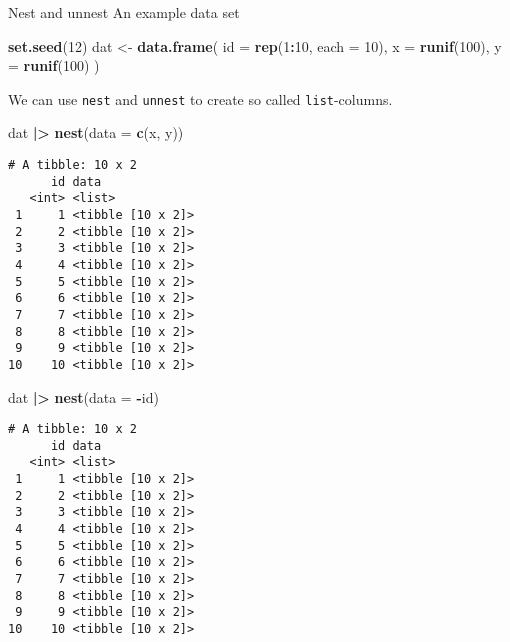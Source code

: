 \documentclass[ignorenonframetext,,t]{beamer}
\let\oldtextbf\textbf
\renewcommand{\textbf}[1]{\textcolor{spamwell}{\oldtextbf{#1}}}
\newenvironment{Shaded}{\begin{snugshade}}{\end{snugshade}}
\newcommand{\AttributeTok}[1]{\textcolor[rgb]{0.13,0.29,0.53}{#1}}
\newcommand{\DecValTok}[1]{\textcolor[rgb]{0.00,0.00,0.81}{#1}}
\newcommand{\FunctionTok}[1]{\textcolor[rgb]{0.13,0.29,0.53}{\textbf{#1}}}
\newcommand{\NormalTok}[1]{#1}
\newcommand{\OtherTok}[1]{\textcolor[rgb]{0.56,0.35,0.01}{#1}}
\newcommand{\SpecialCharTok}[1]{\textcolor[rgb]{0.81,0.36,0.00}{\textbf{#1}}}
\begin{document}
\begin{frame}[fragile]{Nest and unnest}
\label{nest-and-unnest}
An example data set

\begin{Shaded}
\begin{Highlighting}[]
\FunctionTok{set.seed}\NormalTok{(}\DecValTok{12}\NormalTok{)}
\NormalTok{dat }\OtherTok{\textless{}{-}} \FunctionTok{data.frame}\NormalTok{(}
  \AttributeTok{id =} \FunctionTok{rep}\NormalTok{(}\DecValTok{1}\SpecialCharTok{:}\DecValTok{10}\NormalTok{, }\AttributeTok{each =} \DecValTok{10}\NormalTok{), }
  \AttributeTok{x =} \FunctionTok{runif}\NormalTok{(}\DecValTok{100}\NormalTok{), }
  \AttributeTok{y =} \FunctionTok{runif}\NormalTok{(}\DecValTok{100}\NormalTok{)}
\NormalTok{)}
\end{Highlighting}
\end{Shaded}
\end{frame}

\begin{frame}[fragile]
We can use \texttt{nest} and \texttt{unnest} to create so called
\texttt{list}-columns.

\begin{Shaded}
\begin{Highlighting}[]
\NormalTok{dat }\SpecialCharTok{|\textgreater{}} \FunctionTok{nest}\NormalTok{(}\AttributeTok{data =} \FunctionTok{c}\NormalTok{(x, y))}
\end{Highlighting}
\end{Shaded}

\begin{verbatim}
# A tibble: 10 x 2
      id data             
   <int> <list>           
 1     1 <tibble [10 x 2]>
 2     2 <tibble [10 x 2]>
 3     3 <tibble [10 x 2]>
 4     4 <tibble [10 x 2]>
 5     5 <tibble [10 x 2]>
 6     6 <tibble [10 x 2]>
 7     7 <tibble [10 x 2]>
 8     8 <tibble [10 x 2]>
 9     9 <tibble [10 x 2]>
10    10 <tibble [10 x 2]>
\end{verbatim}
\end{frame}

\begin{frame}[fragile]
\begin{Shaded}
\begin{Highlighting}[]
\NormalTok{dat }\SpecialCharTok{|\textgreater{}} \FunctionTok{nest}\NormalTok{(}\AttributeTok{data =} \SpecialCharTok{{-}}\NormalTok{id)}
\end{Highlighting}
\end{Shaded}

\begin{verbatim}
# A tibble: 10 x 2
      id data             
   <int> <list>           
 1     1 <tibble [10 x 2]>
 2     2 <tibble [10 x 2]>
 3     3 <tibble [10 x 2]>
 4     4 <tibble [10 x 2]>
 5     5 <tibble [10 x 2]>
 6     6 <tibble [10 x 2]>
 7     7 <tibble [10 x 2]>
 8     8 <tibble [10 x 2]>
 9     9 <tibble [10 x 2]>
10    10 <tibble [10 x 2]>
\end{verbatim}
\end{frame}
\end{document}
